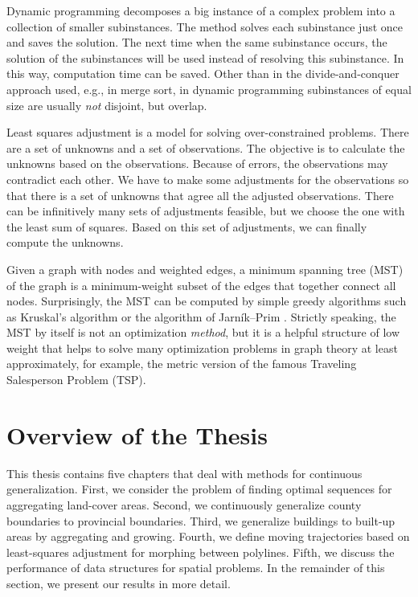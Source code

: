 Dynamic programming decomposes 
a big instance of a complex problem 
into a collection of smaller subinstances.
The method solves each subinstance just once and saves the 
solution. 
The next time when the same subinstance occurs, the solution of 
the subinstances will be used instead of resolving this 
subinstance. 
In this way, computation time can be saved.
Other than in the divide-and-conquer approach used, 
e.g., in merge sort, 
in dynamic programming subinstances of equal size 
are usually \emph{not} disjoint, but overlap.

Least squares adjustment is a model for solving 
over-constrained problems.  
There are a set of unknowns and a set of observations.
The objective is to calculate the unknowns based on the 
observations.
Because of errors, the observations may contradict each other.
We have to make some adjustments for the 
observations so that there is a set of unknowns that agree 
all the adjusted observations.
There can be infinitively many sets of adjustments feasible, 
but we choose the one with the least sum of squares.
Based on this set of adjustments,
we can finally compute the unknowns.



Given a graph with nodes and weighted edges, 
a minimum spanning tree (MST) of the graph is a minimum-weight subset
of the edges that together connect all nodes.
Surprisingly, the MST can be computed by simple greedy algorithms
such as Kruskal's algorithm \parencite{Kruskal1956}
or the algorithm of Jarn\'ik--Prim \parencite{Jarnik1930,Prim1957}.
Strictly speaking, the MST by itself is not an optimization
\emph{method}, but it is a helpful structure of low weight that helps
to solve many optimization problems in graph theory at least
approximately, for example, the metric version of the famous Traveling
Salesperson Problem (TSP).


\section{Overview of the Thesis}
\label{sec:Intro_Overview}

This thesis contains five chapters that deal with methods for 
continuous 
generalization. 
First, we consider the problem of finding 
optimal sequences for aggregating land-cover areas.
%
Second, we continuously generalize county boundaries to
provincial boundaries.
%
Third, we generalize buildings to built-up areas 
by aggregating and growing.
%
Fourth, we define moving trajectories
based on least-squares adjustment
for morphing between polylines.
%
Fifth, we discuss the performance 
of data structures for spatial problems.
In the remainder of this section, 
we present our results in more detail.


